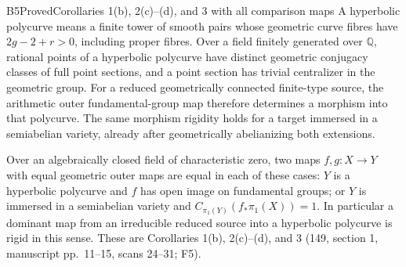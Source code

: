 \begin{result}{B5}{Proved}{Corollaries 1(b), 2(c)--(d), and 3 with all comparison maps}
\label{res:B5}
A hyperbolic polycurve means a finite tower of smooth pairs whose
geometric curve fibres have $2g-2+r>0$, including proper fibres.
Over a field finitely generated over $\mathbb Q$, rational points
of a hyperbolic polycurve have distinct geometric conjugacy classes
of full point sections, and a point section has trivial centralizer
in the geometric group. For a reduced geometrically connected
finite-type source, the arithmetic outer fundamental-group map
therefore determines a morphism into that polycurve. The same
morphism rigidity holds for a target immersed in a semiabelian
variety, already after geometrically abelianizing both extensions.

Over an algebraically closed field of characteristic zero, two maps
$f,g:X\to Y$ with equal geometric outer maps are equal in each of
these cases: $Y$ is a hyperbolic polycurve and $f$ has open image
on fundamental groups; or $Y$ is immersed in a semiabelian variety
and $C_{\pi_1(Y)}(f_*\pi_1(X))=1$. In particular a dominant map
from an irreducible reduced source into a hyperbolic polycurve is
rigid in this sense. These are Corollaries 1(b), 2(c)--(d), and 3
(149, section 1, manuscript pp.~11--15, scans 24--31; F5).
\end{result}
